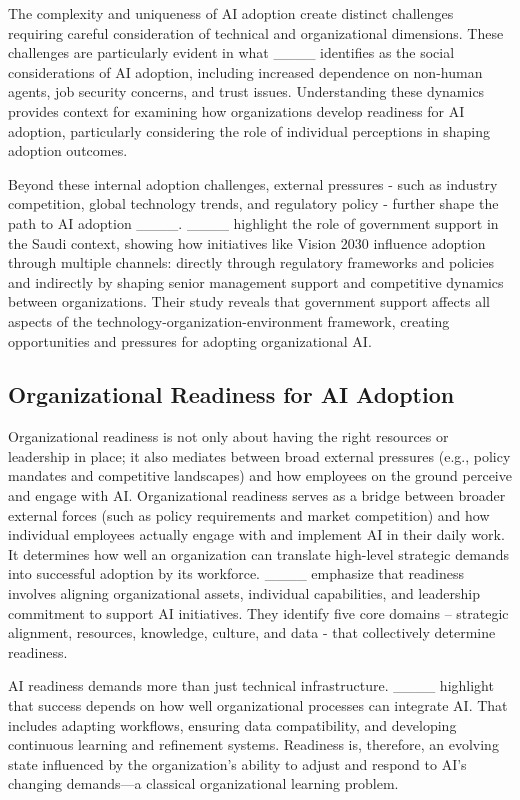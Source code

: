The complexity and uniqueness of AI adoption create distinct challenges requiring careful consideration of technical and organizational dimensions. These challenges are particularly evident in what ____ identifies as the social considerations of AI adoption, including increased dependence on non-human agents, job security concerns, and trust issues. Understanding these dynamics provides context for examining how organizations develop readiness for AI adoption, particularly considering the role of individual perceptions in shaping adoption outcomes.

Beyond these internal adoption challenges, external pressures - such as industry competition, global technology trends, and regulatory policy - further shape the path to AI adoption ____. ____ highlight the role of government support in the Saudi context, showing how initiatives like Vision 2030 influence adoption through multiple channels: directly through regulatory frameworks and policies and indirectly by shaping senior management support and competitive dynamics between organizations. Their study reveals that government support affects all aspects of the technology-organization-environment framework, creating opportunities and pressures for adopting organizational AI.

\subsection{Organizational Readiness for AI Adoption}


Organizational readiness is not only about having the right resources or leadership in place; it also mediates between broad external pressures (e.g., policy mandates and competitive landscapes) and how employees on the ground perceive and engage with AI. Organizational readiness serves as a bridge between broader external forces (such as policy requirements and market competition) and how individual employees actually engage with and implement AI in their daily work. It determines how well an organization can translate high-level strategic demands into successful adoption by its workforce. ____ emphasize that readiness involves aligning organizational assets, individual capabilities, and leadership commitment to support AI initiatives. They identify five core domains – strategic alignment, resources, knowledge, culture, and data - that collectively determine readiness.

AI readiness demands more than just technical infrastructure. ____ highlight that success depends on how well organizational processes can integrate AI. That includes adapting workflows, ensuring data compatibility, and developing continuous learning and refinement systems. Readiness is, therefore, an evolving state influenced by the organization's ability to adjust and respond to AI's changing demands—a classical organizational learning problem.

